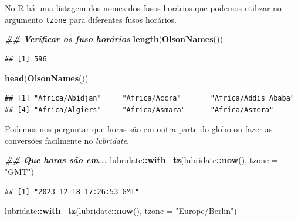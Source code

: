 \documentclass[
]{article}
\newenvironment{Shaded}{\begin{snugshade}}{\end{snugshade}}
\newcommand{\AttributeTok}[1]{\textcolor[rgb]{0.13,0.29,0.53}{#1}}
\newcommand{\DocumentationTok}[1]{\textcolor[rgb]{0.56,0.35,0.01}{\textbf{\textit{#1}}}}
\newcommand{\FunctionTok}[1]{\textcolor[rgb]{0.13,0.29,0.53}{\textbf{#1}}}
\newcommand{\NormalTok}[1]{#1}
\newcommand{\SpecialCharTok}[1]{\textcolor[rgb]{0.81,0.36,0.00}{\textbf{#1}}}
\newcommand{\StringTok}[1]{\textcolor[rgb]{0.31,0.60,0.02}{#1}}
\begin{document}
No R há uma listagem dos nomes dos fusos horários que podemos utilizar no argumento \texttt{tzone} para diferentes fusos horários.

\begin{Shaded}
\begin{Highlighting}[]
\DocumentationTok{\#\# Verificar os fuso horários}
\FunctionTok{length}\NormalTok{(}\FunctionTok{OlsonNames}\NormalTok{())}
\end{Highlighting}
\end{Shaded}

\begin{verbatim}
## [1] 596
\end{verbatim}

\begin{Shaded}
\begin{Highlighting}[]
\FunctionTok{head}\NormalTok{(}\FunctionTok{OlsonNames}\NormalTok{())}
\end{Highlighting}
\end{Shaded}

\begin{verbatim}
## [1] "Africa/Abidjan"     "Africa/Accra"       "Africa/Addis_Ababa"
## [4] "Africa/Algiers"     "Africa/Asmara"      "Africa/Asmera"
\end{verbatim}

Podemos nos perguntar que horas são em outra parte do globo ou fazer as conversões facilmente no \emph{lubridate}.

\begin{Shaded}
\begin{Highlighting}[]
\DocumentationTok{\#\# Que horas são em...}
\NormalTok{lubridate}\SpecialCharTok{::}\FunctionTok{with\_tz}\NormalTok{(lubridate}\SpecialCharTok{::}\FunctionTok{now}\NormalTok{(), }\AttributeTok{tzone =} \StringTok{"GMT"}\NormalTok{)}
\end{Highlighting}
\end{Shaded}

\begin{verbatim}
## [1] "2023-12-18 17:26:53 GMT"
\end{verbatim}

\begin{Shaded}
\begin{Highlighting}[]
\NormalTok{lubridate}\SpecialCharTok{::}\FunctionTok{with\_tz}\NormalTok{(lubridate}\SpecialCharTok{::}\FunctionTok{now}\NormalTok{(), }\AttributeTok{tzone =} \StringTok{"Europe/Berlin"}\NormalTok{)}
\end{Highlighting}
\end{Shaded}
\end{document}
